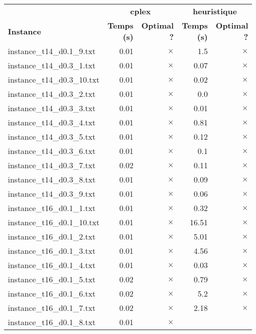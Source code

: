 \documentclass{article}
\begin{document}
\newpage
\begin{center}
\renewcommand{\arraystretch}{1.4} 
 \begin{tabular}{lrrrr}
	\hline
 & \multicolumn{2}{c}{\textbf{cplex}} & \multicolumn{2}{c}{\textbf{heuristique}}\\
\textbf{Instance}  & \textbf{Temps (s)} & \textbf{Optimal ?}  & \textbf{Temps (s)} & \textbf{Optimal ?} \\\hline

instance\_t14\_d0.1\_9.txt & 0.01 & 
$\times$
 & 1.5 & 
$\times$
\\
instance\_t14\_d0.3\_1.txt & 0.01 & 
$\times$
 & 0.07 & 
$\times$
\\
instance\_t14\_d0.3\_10.txt & 0.01 & 
$\times$
 & 0.02 & 
$\times$
\\
instance\_t14\_d0.3\_2.txt & 0.01 & 
$\times$
 & 0.0 & 
$\times$
\\
instance\_t14\_d0.3\_3.txt & 0.01 & 
$\times$
 & 0.01 & 
$\times$
\\
instance\_t14\_d0.3\_4.txt & 0.01 & 
$\times$
 & 0.81 & 
$\times$
\\
instance\_t14\_d0.3\_5.txt & 0.01 & 
$\times$
 & 0.12 & 
$\times$
\\
instance\_t14\_d0.3\_6.txt & 0.01 & 
$\times$
 & 0.1 & 
$\times$
\\
instance\_t14\_d0.3\_7.txt & 0.02 & 
$\times$
 & 0.11 & 
$\times$
\\
instance\_t14\_d0.3\_8.txt & 0.01 & 
$\times$
 & 0.09 & 
$\times$
\\
instance\_t14\_d0.3\_9.txt & 0.01 & 
$\times$
 & 0.06 & 
$\times$
\\
instance\_t16\_d0.1\_1.txt & 0.01 & 
$\times$
 & 0.32 & 
$\times$
\\
instance\_t16\_d0.1\_10.txt & 0.01 & 
$\times$
 & 16.51 & 
$\times$
\\
instance\_t16\_d0.1\_2.txt & 0.01 & 
$\times$
 & 5.01 & 
$\times$
\\
instance\_t16\_d0.1\_3.txt & 0.01 & 
$\times$
 & 4.56 & 
$\times$
\\
instance\_t16\_d0.1\_4.txt & 0.01 & 
$\times$
 & 0.03 & 
$\times$
\\
instance\_t16\_d0.1\_5.txt & 0.02 & 
$\times$
 & 0.79 & 
$\times$
\\
instance\_t16\_d0.1\_6.txt & 0.02 & 
$\times$
 & 5.2 & 
$\times$
\\
instance\_t16\_d0.1\_7.txt & 0.02 & 
$\times$
 & 2.18 & 
$\times$
\\
instance\_t16\_d0.1\_8.txt & 0.01 & 
$\times$

\end{tabular}
\end{center}
\end{document}
